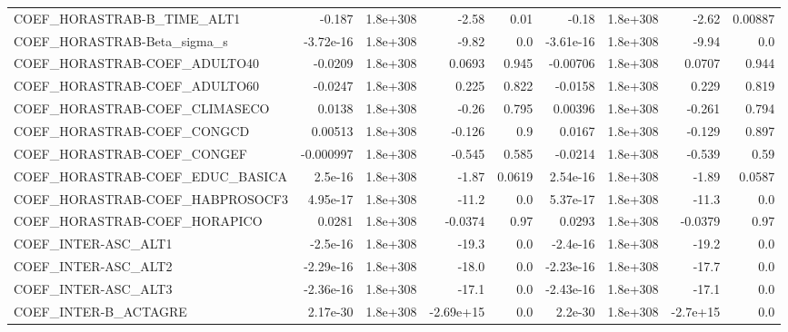 \begin{tabular}{lrrrrrrrr}
COEF\_HORASTRAB-B\_TIME\_ALT1        &      -0.187 &     1.8e+308 &     -2.58 &     0.01 &      -0.18 &    1.8e+308 &        -2.62 &       0.00887 \\
COEF\_HORASTRAB-Beta\_sigma\_s       &   -3.72e-16 &     1.8e+308 &     -9.82 &      0.0 &  -3.61e-16 &    1.8e+308 &        -9.94 &           0.0 \\
COEF\_HORASTRAB-COEF\_ADULTO40      &     -0.0209 &     1.8e+308 &    0.0693 &    0.945 &   -0.00706 &    1.8e+308 &       0.0707 &         0.944 \\
COEF\_HORASTRAB-COEF\_ADULTO60      &     -0.0247 &     1.8e+308 &     0.225 &    0.822 &    -0.0158 &    1.8e+308 &        0.229 &         0.819 \\
COEF\_HORASTRAB-COEF\_CLIMASECO     &      0.0138 &     1.8e+308 &     -0.26 &    0.795 &    0.00396 &    1.8e+308 &       -0.261 &         0.794 \\
COEF\_HORASTRAB-COEF\_CONGCD        &     0.00513 &     1.8e+308 &    -0.126 &      0.9 &     0.0167 &    1.8e+308 &       -0.129 &         0.897 \\
COEF\_HORASTRAB-COEF\_CONGEF        &   -0.000997 &     1.8e+308 &    -0.545 &    0.585 &    -0.0214 &    1.8e+308 &       -0.539 &          0.59 \\
COEF\_HORASTRAB-COEF\_EDUC\_BASICA   &     2.5e-16 &     1.8e+308 &     -1.87 &   0.0619 &   2.54e-16 &    1.8e+308 &        -1.89 &        0.0587 \\
COEF\_HORASTRAB-COEF\_HABPROSOCF3   &    4.95e-17 &     1.8e+308 &     -11.2 &      0.0 &   5.37e-17 &    1.8e+308 &        -11.3 &           0.0 \\
COEF\_HORASTRAB-COEF\_HORAPICO      &      0.0281 &     1.8e+308 &   -0.0374 &     0.97 &     0.0293 &    1.8e+308 &      -0.0379 &          0.97 \\
COEF\_INTER-ASC\_ALT1               &    -2.5e-16 &     1.8e+308 &     -19.3 &      0.0 &   -2.4e-16 &    1.8e+308 &        -19.2 &           0.0 \\
COEF\_INTER-ASC\_ALT2               &   -2.29e-16 &     1.8e+308 &     -18.0 &      0.0 &  -2.23e-16 &    1.8e+308 &        -17.7 &           0.0 \\
COEF\_INTER-ASC\_ALT3               &   -2.36e-16 &     1.8e+308 &     -17.1 &      0.0 &  -2.43e-16 &    1.8e+308 &        -17.1 &           0.0 \\
COEF\_INTER-B\_ACTAGRE              &    2.17e-30 &     1.8e+308 & -2.69e+15 &      0.0 &    2.2e-30 &    1.8e+308 &     -2.7e+15 &           0.0 \\

\end{tabular}
